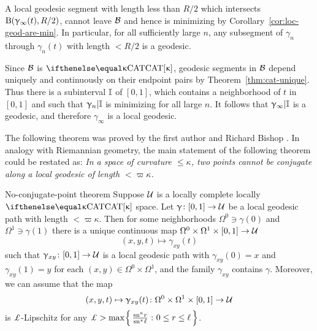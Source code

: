
A local geodesic segment  with length less than $R/2$ which intersects $\mathrm{B}{}(\upgamma_\infty(t),R/2)$, cannot leave $\mathcal{B}$ and hence  is  minimizing by Corollary~\ref{cor:loc-geod-are-min}.  In particular, for all sufficiently large $n$, any subsegment  of $\gamma_n$ through $\gamma_n(t)$  with length $<R/2$ is a geodesic.


Since $\mathcal{B}$ is $\CAT\kappa$, geodesic segments in $\mathcal{B}$ depend uniquely and continuously on their endpoint pairs by Theorem~\ref{thm:cat-unique}.  
Thus there is a subinterval $\mathbb{I}$ of $[0,1]$,
which contains a neighborhood of $t$ in $[0,1]$
and such that $\upgamma_n|\mathbb{I}$ is minimizing for all large $n$.
It follows that $\upgamma_\infty|\mathbb{I}$ is a geodesic,
and therefore $\gamma_\infty$ is a local geodesic.
\qeds


The following theorem was proved by the first author and Richard Bishop \cite{a-b:h-c}.
In analogy with Riemannian geometry, the main statement of the following theorem could be restated as: 
\emph{In a space of curvature $\le\kappa$, two points cannot be conjugate along a local geodesic of length $<\varpi\kappa$.}


\begin{thm}{No-conjugate-point theorem}
\label{thm:no-conj-pt}
Suppose $\mathcal{U}$ is a locally complete locally $\CAT\kappa$ space.
Let $\gamma\:[0,1]\to\spc{U}$ be a local geodesic path with length $<\varpi\kappa$.
Then for some neighborhoods $\Omega^0\ni \gamma(0)$ and $\Omega^1\ni\gamma(1)$ 
there is a unique continuous map $\Omega^0\times \Omega^1\times[0,1]\to\spc{U}$
\[(x,y,t)\mapsto\gamma_{x y}(t)\]
such that 
$\gamma_{x y}\:[0,1]\to\spc{U}$ is a local geodesic path with 
$\gamma_{x y}(0)=x$ and 
$\gamma_{x y}(1)=y$ for each $(x,y)\in\Omega^0\times\Omega^1$,
and the family $\gamma_{x y}$ contains $\gamma$.  
Moreover, we can assume that the map 
\[(x,y,t)\mapsto\gamma_{x y}(t)\:\Omega^0\times\Omega^1\times[0,1]\to\spc{U}\] 
is $\Lip$-Lipschitz
for any
$\Lip>\max\set{\tfrac{\sn\kappa r}{\sn\kappa \ell}}{0\le r\le \ell}$.
\end{thm}


